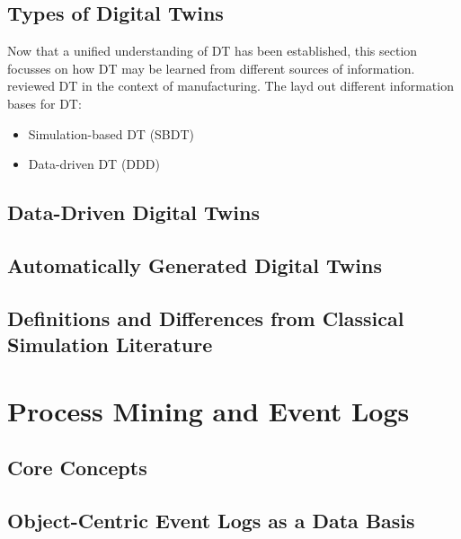 \subsection{Types of Digital Twins}
Now that a unified understanding of DT has been established, this section focusses on how DT may be learned from different sources of information. \citeauthor{schwede2024learning} reviewed DT in the context of manufacturing. The layd out different information bases for DT:

\begin{itemize}
  \item Simulation-based DT (SBDT) \parencite{Lugaresi2021aifac}
  \item Data-driven DT (DDD) \parencite{schwede2024learning}
\end{itemize}



\subsection{Data-Driven Digital Twins}

\subsection{Automatically Generated Digital Twins}
\subsection{Definitions and Differences from Classical Simulation Literature}

\section{Process Mining and Event Logs}
\label{sec:process-mining}

\subsection{Core Concepts}

\subsection{Object-Centric Event Logs as a Data Basis}
\label{sec:object-centric-event-logs}


